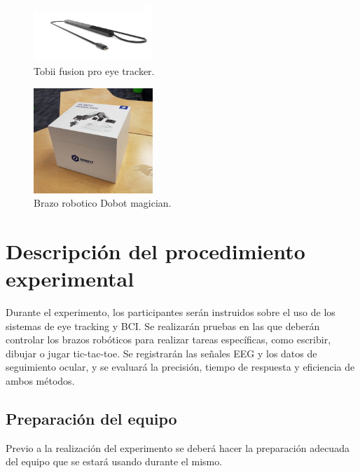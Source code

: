 \documentclass[12pt]{article}
\begin{document}
\begin{figure}[h!]
    \centering
    \includegraphics[width=0.4\textwidth]{recursos_img/tobii_fusion_pro.jpg}  %
    \caption{Tobii fusion pro eye tracker.}
    \label{fig:mi_imagen}  %
\end{figure}

\begin{figure}[h!]
    \centering
    \includegraphics[width=0.4\textwidth]{recursos_img/dobot_magician.jpg}  %
    \caption{Brazo robotico Dobot magician.}
    \label{fig:mi_imagen}  %
\end{figure}

\section{Descripción del procedimiento experimental}
Durante el experimento, los participantes serán instruidos sobre el uso de los 
sistemas de eye tracking y BCI. Se realizarán pruebas en las que deberán controlar 
los brazos robóticos para realizar tareas específicas, como escribir, dibujar o 
jugar tic-tac-toe. Se registrarán las señales EEG y los datos de seguimiento 
ocular, y se evaluará la precisión, tiempo de respuesta y eficiencia de ambos 
métodos.

\subsection{Preparación del equipo}
Previo a la realización del experimento se deberá hacer la preparación 
adecuada del equipo que se estará usando durante el mismo.
\end{document}
